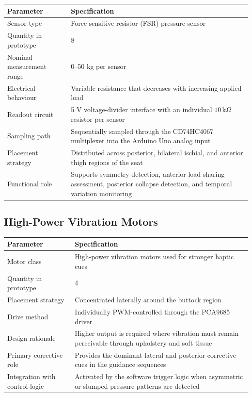 \documentclass[11pt, a4paper]{article}
\begin{document}
\begin{table}[H]
    \centering
    \footnotesize
    \begin{tabular}{p{} p{}}
        \toprule
        \textbf{Parameter} & \textbf{Specification} \\
        \midrule
        Sensor type & Force-sensitive resistor (FSR) pressure sensor \\
        Quantity in prototype & 8 \\
        Nominal measurement range & 0--50 kg per sensor \\
        Electrical behaviour & Variable resistance that decreases with increasing applied load \\
        Readout circuit & 5 V voltage-divider interface with an individual $10\,\text{k}\Omega$ resistor per sensor \\
        Sampling path & Sequentially sampled through the CD74HC4067 multiplexer into the Arduino Uno analog input \\
        Placement strategy & Distributed across posterior, bilateral ischial, and anterior thigh regions of the seat \\
        Functional role & Supports symmetry detection, anterior load sharing assessment, posterior collapse detection, and temporal variation monitoring \\
        \bottomrule
    \end{tabular}
\end{table}

\subsection{High-Power Vibration Motors}
\label{app:motor_high}

\begin{table}[H]
    \centering
    \footnotesize
    \begin{tabular}{p{} p{}}
        \toprule
        \textbf{Parameter} & \textbf{Specification} \\
        \midrule
        Motor class & High-power vibration motors used for stronger haptic cues \\
        Quantity in prototype & 4 \\
        Placement strategy & Concentrated laterally around the buttock region \\
        Drive method & Individually PWM-controlled through the PCA9685 driver \\
        Design rationale & Higher output is required where vibration must remain perceivable through upholstery and soft tissue \\
        Primary corrective role & Provides the dominant lateral and posterior corrective cues in the guidance sequences \\
        Integration with control logic & Activated by the software trigger logic when asymmetric or slumped pressure patterns are detected \\
        \bottomrule
    \end{tabular}
\end{table}
\end{document}
